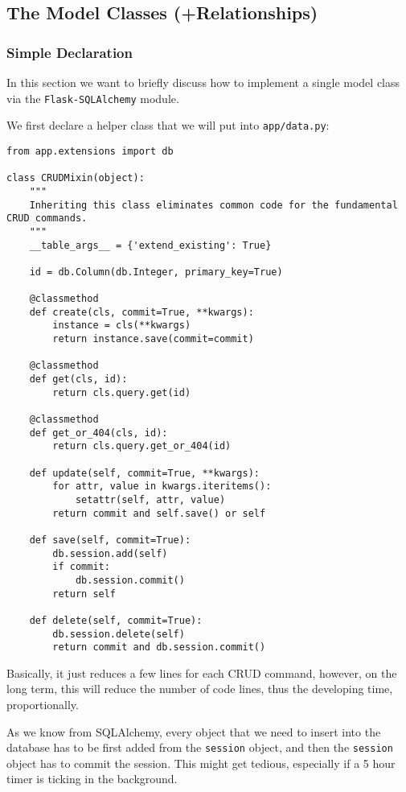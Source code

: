 \documentclass[../main/main.tex]{subfiles}
\begin{document}
\subsection{The Model Classes (+Relationships)}

\subsubsection{Simple Declaration}
In this section we want to briefly discuss how to implement a single
model class via the \lstinline|Flask-SQLAlchemy| module. 

We first declare a helper class that we will put into
\lstinline|app/data.py|: 

\begin{lstlisting}[caption=app/data.py, label=lst:data.py]
from app.extensions import db

class CRUDMixin(object):
    """
    Inheriting this class eliminates common code for the fundamental CRUD commands.
    """
    __table_args__ = {'extend_existing': True}

    id = db.Column(db.Integer, primary_key=True)

    @classmethod
    def create(cls, commit=True, **kwargs):
        instance = cls(**kwargs)
        return instance.save(commit=commit)

    @classmethod
    def get(cls, id):
        return cls.query.get(id)

    @classmethod
    def get_or_404(cls, id):
        return cls.query.get_or_404(id)

    def update(self, commit=True, **kwargs):
        for attr, value in kwargs.iteritems():
            setattr(self, attr, value)
        return commit and self.save() or self

    def save(self, commit=True):
        db.session.add(self)
        if commit:
            db.session.commit()
        return self

    def delete(self, commit=True):
        db.session.delete(self)
        return commit and db.session.commit()
\end{lstlisting}

Basically, it just reduces a few lines for each CRUD command, however,
on the long term, this will reduce the number of code lines, thus the
developing time, proportionally.

As we know from SQLAlchemy, every object that we need to insert into the
database has to be first added from the \lstinline|session| object, and
then the \lstinline|session| object has to commit the session. This
might get tedious, especially if a 5 hour timer is ticking in the
background.
\end{document}

